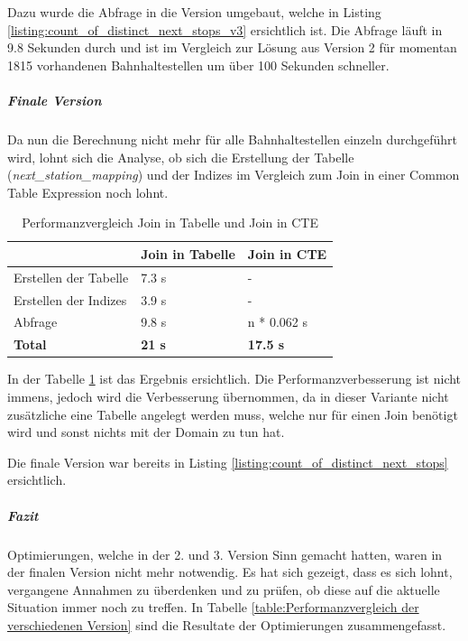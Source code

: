 Dazu wurde die Abfrage in die Version umgebaut, welche in Listing \ref{listing:count_of_distinct_next_stops_v3} ersichtlich ist.
Die Abfrage läuft in 9.8 Sekunden durch und ist im Vergleich zur Lösung aus Version 2 für momentan 1815 vorhandenen Bahnhaltestellen um über 100 Sekunden schneller.

\subparagraph{Finale Version}
Da nun die Berechnung nicht mehr für alle Bahnhaltestellen einzeln durchgeführt wird, lohnt sich die Analyse, ob sich die Erstellung der Tabelle (\emph{next\_station\_mapping}) und der Indizes im Vergleich zum Join in einer Common Table Expression noch lohnt.

\begin{table}[ht]
    \centering
    \begin{tabular}[ht]{l l l}
        \toprule
        \textbf{} 
                                & \textbf{Join in Tabelle}
                                & \textbf{Join in CTE}\\
        \midrule
        Erstellen der Tabelle
                                & 7.3 s
                                & - \\
        Erstellen der Indizes
                                & 3.9 s
                                & - \\
        Abfrage
                                & 9.8 s
                                & n * 0.062 s\\
        \textbf{Total}
                                & \textbf{21 s}
                                & \textbf{17.5 s}\\            
        \bottomrule
    \end{tabular}
    \caption{Performanzvergleich Join in Tabelle und Join in CTE}
    \label{table:Performanzvergleich Join in Tabelle und Join in CTE}
\end{table}

In der Tabelle \ref{table:Performanzvergleich Join in Tabelle und Join in CTE} ist das Ergebnis ersichtlich.
Die Performanzverbesserung ist nicht immens, jedoch wird die Verbesserung übernommen, da in dieser Variante nicht zusätzliche eine Tabelle angelegt werden muss, welche nur für einen Join benötigt wird und sonst nichts mit der Domain zu tun hat.

Die finale Version war bereits in Listing \ref{listing:count_of_distinct_next_stops} ersichtlich.

\subparagraph{Fazit}
Optimierungen, welche in der 2. und 3. Version Sinn gemacht hatten, waren in der finalen Version nicht mehr notwendig.
Es hat sich gezeigt, dass es sich lohnt, vergangene Annahmen zu überdenken und zu prüfen, ob diese auf die aktuelle Situation immer noch zu treffen.
In Tabelle \ref{table:Performanzvergleich der verschiedenen Version} sind die Resultate der Optimierungen zusammengefasst.

